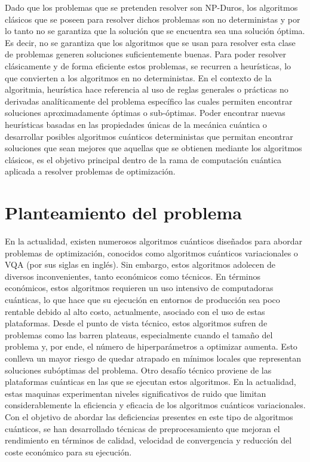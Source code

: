 \newpage

Dado que los problemas que se pretenden resolver son NP-Duros, los algoritmos clásicos que se poseen para resolver dichos problemas son no deterministas y por lo tanto no se garantiza que la solución que se encuentra sea una solución óptima. Es decir, no se garantiza que los algoritmos que se usan para resolver esta clase de problemas generen soluciones suficientemente buenas. Para poder resolver clásicamente y de forma eficiente estos problemas, se recurren a heurísticas, lo que convierten a los algoritmos en no deterministas. En el contexto de la algoritmia, heurística hace referencia al uso de reglas generales o prácticas no derivadas analíticamente del problema específico las cuales permiten encontrar soluciones aproximadamente óptimas o sub-óptimas. Poder encontrar nuevas heurísticas basadas en las propiedades únicas de la mecánica cuántica o desarrollar posibles algoritmos cuánticos deterministas que permitan encontrar soluciones que sean mejores que aquellas que se obtienen mediante los algoritmos clásicos, es el objetivo principal dentro de la rama de computación cuántica aplicada a resolver problemas de optimización. 

\section{Planteamiento del problema}

En la actualidad, existen numerosos algoritmos cuánticos diseñados para abordar problemas de optimización, conocidos como algoritmos cuánticos variacionales o VQA (por sus siglas en inglés). Sin embargo, estos algoritmos adolecen de diversos inconvenientes, tanto económicos como técnicos. En términos económicos, estos algoritmos requieren un uso intensivo de computadoras cuánticas, lo que hace que su ejecución en entornos de producción sea poco rentable debido al alto costo, actualmente, asociado con el uso de estas plataformas. Desde el punto de vista técnico, estos algoritmos sufren de problemas como las barren plateaus, especialmente cuando el tamaño del problema y, por ende, el número de hiperparámetros a optimizar aumenta. Esto conlleva un mayor riesgo de quedar atrapado en mínimos locales que representan soluciones subóptimas del problema. Otro desafío técnico proviene de las plataformas cuánticas en las que se ejecutan estos algoritmos. En la actualidad, estas maquinas experimentan niveles significativos de ruido que limitan considerablemente la eficiencia y eficacia de los algoritmos cuánticos variacionales. Con el objetivo de abordar las deficiencias presentes en este tipo de algoritmos cuánticos, se han desarrollado técnicas de preprocesamiento que mejoran el rendimiento en términos de calidad, velocidad de convergencia y reducción del coste económico para su ejecución. 

